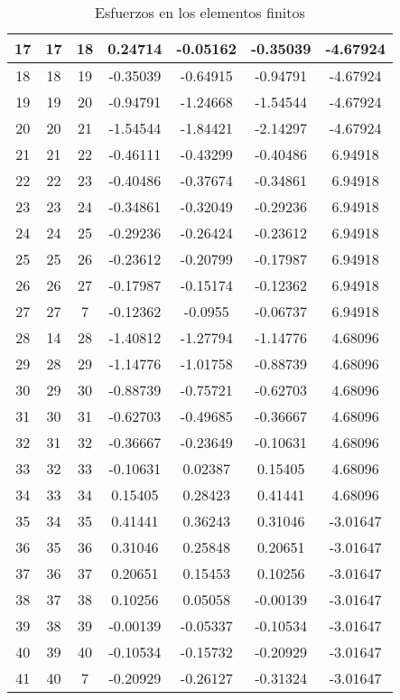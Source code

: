 \documentclass[10pt,a4paper]{article}
\begin{document}
\begin{table}[H]
{\begin{tabular}{c|c|c||c|c|c|c}
        \hline
        17 & 17 & 18 & 0.24714 & -0.05162 & -0.35039 & -4.67924 \\
        \hline
        18 & 18 & 19 & -0.35039 & -0.64915 & -0.94791 & -4.67924 \\
        \hline
        19 & 19 & 20 & -0.94791 & -1.24668 & -1.54544 & -4.67924 \\
        \hline
        20 & 20 & 21 & -1.54544 & -1.84421 & -2.14297 & -4.67924 \\
        \hline
        21 & 21 & 22 & -0.46111 & -0.43299 & -0.40486 & 6.94918 \\
        \hline
        22 & 22 & 23 & -0.40486 & -0.37674 & -0.34861 & 6.94918 \\
        \hline
        23 & 23 & 24 & -0.34861 & -0.32049 & -0.29236 & 6.94918 \\
        \hline
        24 & 24 & 25 & -0.29236 & -0.26424 & -0.23612 & 6.94918 \\
        \hline
        25 & 25 & 26 & -0.23612 & -0.20799 & -0.17987 & 6.94918 \\
        \hline
        26 & 26 & 27 & -0.17987 & -0.15174 & -0.12362 & 6.94918 \\
        \hline
        27 & 27 & 7 & -0.12362 & -0.0955 & -0.06737 & 6.94918 \\
        \hline
        28 & 14 & 28 & -1.40812 & -1.27794 & -1.14776 & 4.68096 \\
        \hline
        29 & 28 & 29 & -1.14776 & -1.01758 & -0.88739 & 4.68096 \\
        \hline
        30 & 29 & 30 & -0.88739 & -0.75721 & -0.62703 & 4.68096 \\
        \hline
        31 & 30 & 31 & -0.62703 & -0.49685 & -0.36667 & 4.68096 \\
        \hline
        32 & 31 & 32 & -0.36667 & -0.23649 & -0.10631 & 4.68096 \\
        \hline
        33 & 32 & 33 & -0.10631 & 0.02387 & 0.15405 & 4.68096 \\
        \hline
        34 & 33 & 34 & 0.15405 & 0.28423 & 0.41441 & 4.68096 \\
        \hline
        35 & 34 & 35 & 0.41441 & 0.36243 & 0.31046 & -3.01647 \\
        \hline
        36 & 35 & 36 & 0.31046 & 0.25848 & 0.20651 & -3.01647 \\
        \hline
        37 & 36 & 37 & 0.20651 & 0.15453 & 0.10256 & -3.01647 \\
        \hline
        38 & 37 & 38 & 0.10256 & 0.05058 & -0.00139 & -3.01647 \\
        \hline
        39 & 38 & 39 & -0.00139 & -0.05337 & -0.10534 & -3.01647 \\
        \hline
        40 & 39 & 40 & -0.10534 & -0.15732 & -0.20929 & -3.01647 \\
        \hline
        41 & 40 & 7 & -0.20929 & -0.26127 & -0.31324 & -3.01647
    \end{tabular}}
    \caption{Esfuerzos en los elementos finitos}
\end{table}
\end{document}
